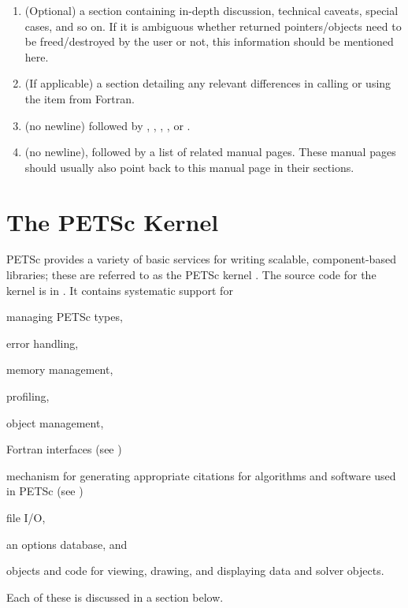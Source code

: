\begin{enumerate}
  \item (Optional) a  section containing in-depth discussion, technical caveats, special cases, and so on.
    If it is ambiguous whether returned pointers/objects need to be freed/destroyed by the user or not, this information should be mentioned here.
  \item (If applicable) a  section detailing any relevant differences in calling or using the item from Fortran.
  \item \label{item:manpagelevel} (no newline) followed by , , , , or .
  \item {} (no newline), followed by a list of related manual pages. These manual pages should usually also point back to this manual page in their  sections.
\end{enumerate}

\chapter{The PETSc Kernel}
\label{chapter:kernel}
PETSc provides a variety of basic services for writing scalable,
component-based libraries; these are referred to as the PETSc
kernel \cite{bgms98}. The source code for the kernel is
in . It contains systematic support for
\begin{tightitemize}
  \item managing PETSc types,
  \item error handling,
  \item memory management,
  \item profiling,
  \item object management,
  \item Fortran interfaces (see \cite{BalayBrownKnepleyMcInnesSmith2015})
  \item mechanism for generating appropriate citations for algorithms and software used in PETSc (see \cite{knepley2013accurately})
  \item file I/O,
  \item an options database, and
  \item objects and code for viewing, drawing, and displaying data and solver objects.
\end{tightitemize}
Each of these is discussed in a section below.

